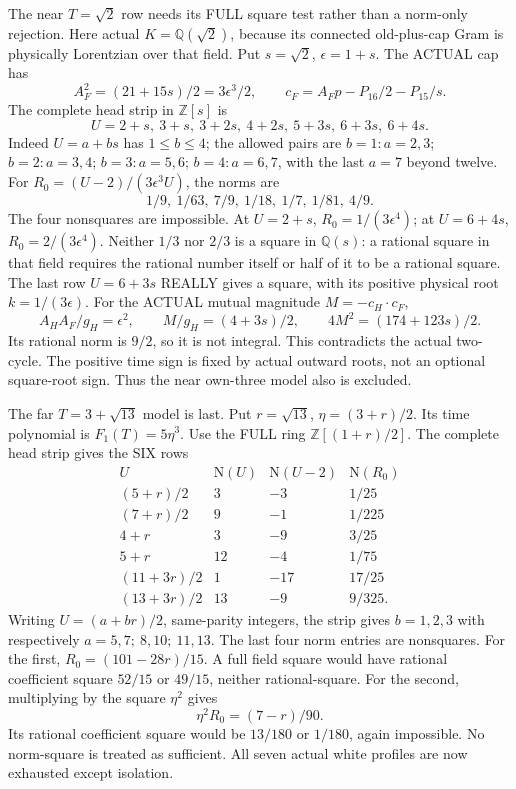 \documentclass[11pt]{article}
\begin{document}
The near \(T=\sqrt2\) row needs its FULL square
test rather than a norm-only rejection.
Here actual \(K=\mathbb Q(\sqrt2)\), because its
connected old-plus-cap Gram is physically Lorentzian
over that field.
Put \(s=\sqrt2\), \(\epsilon=1+s\).
The ACTUAL cap has
\[
 A_F^2=(21+15s)/2=3\epsilon^3/2,\qquad
 c_F=A_Fp-P_{16}/2-P_{15}/s .
\]
The complete head strip in \(\mathbb Z[s]\) is
\[
         U=2+s,\ 3+s,\ 3+2s,\ 4+2s,\ 5+3s,\ 6+3s,\ 6+4s .
\]
Indeed \(U=a+bs\) has \(1\le b\le4\);
the allowed pairs are
\(b=1:a=2,3\);
\(b=2:a=3,4\);
\(b=3:a=5,6\);
\(b=4:a=6,7\), with the last \(a=7\) beyond twelve.
For \(R_0=(U-2)/(3\epsilon^3U)\), the norms are
\[
                      1/9,\ 1/63,\ 7/9,\ 1/18,\ 1/7,\ 1/81,\ 4/9 .
\]
The four nonsquares are impossible.
At \(U=2+s\), \(R_0=1/(3\epsilon^4)\);
at \(U=6+4s\), \(R_0=2/(3\epsilon^4)\).
Neither \(1/3\) nor \(2/3\) is a square in
\(\mathbb Q(s)\): a rational square in that field
requires the rational number itself or half of
it to be a rational square.
The last row \(U=6+3s\) REALLY gives a square,
with its positive physical root \(k=1/(3\epsilon)\).
For the ACTUAL mutual magnitude \(M=-c_H\cdot c_F\),
\[
 A_HA_F/g_H=\epsilon^2,\qquad
 M/g_H=(4+3s)/2,\qquad
                    4M^2=(174+123s)/2 .
\]
Its rational norm is \(9/2\), so it is not integral.
This contradicts the actual two-cycle.
The positive time sign is fixed by actual outward
roots, not an optional square-root sign.
Thus the near own-three model also is excluded.

The far \(T=3+\sqrt{13}\) model is last.
Put \(r=\sqrt{13}\), \(\eta=(3+r)/2\).
Its time polynomial is \(F_1(T)=5\eta^3\).
Use the FULL ring \(\mathbb Z[(1+r)/2]\).
The complete head strip gives the SIX rows
\[
\begin{array}{c|r|r|c}
 U&\mathrm N(U)&\mathrm N(U-2)&\mathrm N(R_0)\\ \hline
 (5+r)/2&3&-3&1/25\\
 (7+r)/2&9&-1&1/225\\
 4+r&3&-9&3/25\\
 5+r&12&-4&1/75\\
 (11+3r)/2&1&-17&17/25\\
 (13+3r)/2&13&-9&9/325 .
\end{array}
\]
Writing \(U=(a+br)/2\), same-parity integers,
the strip gives \(b=1,2,3\) with respectively
\(a=5,7;\ 8,10;\ 11,13\).
The last four norm entries are nonsquares.
For the first,
\(R_0=(101-28r)/15\).
A full field square would have rational coefficient
square \(52/15\) or \(49/15\), neither rational-square.
For the second, multiplying by the square \(\eta^2\)
gives
\[
                   \eta^2R_0=(7-r)/90 .
\]
Its rational coefficient square would be \(13/180\)
or \(1/180\), again impossible.
No norm-square is treated as sufficient.
All seven actual white profiles are now exhausted
except isolation.
\end{document}

